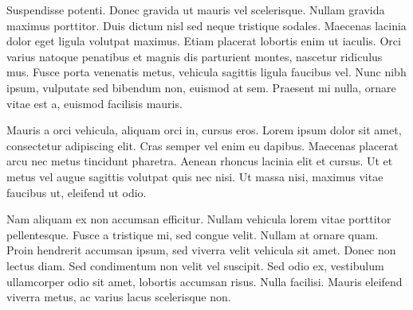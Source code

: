 \documentclass[10pt]{article}
\begin{document}
Suspendisse potenti. Donec gravida ut mauris vel scelerisque. Nullam
gravida maximus porttitor. Duis dictum nisl sed neque tristique sodales.
Maecenas lacinia dolor eget ligula volutpat maximus. Etiam placerat
lobortis enim ut iaculis. Orci varius natoque penatibus et magnis dis
parturient montes, nascetur ridiculus mus. Fusce porta venenatis metus,
vehicula sagittis ligula faucibus vel. Nunc nibh ipsum, vulputate sed
bibendum non, euismod at sem. Praesent mi nulla, ornare vitae est a,
euismod facilisis mauris.

Mauris a orci vehicula, aliquam orci in, cursus eros. Lorem ipsum dolor
sit amet, consectetur adipiscing elit. Cras semper vel enim eu dapibus.
Maecenas placerat arcu nec metus tincidunt pharetra. Aenean rhoncus
lacinia elit et cursus. Ut et metus vel augue sagittis volutpat quis nec
nisi. Ut massa nisi, maximus vitae faucibus ut, eleifend ut odio.

Nam aliquam ex non accumsan efficitur. Nullam vehicula lorem vitae
porttitor pellentesque. Fusce a tristique mi, sed congue velit. Nullam
at ornare quam. Proin hendrerit accumsan ipsum, sed viverra velit
vehicula sit amet. Donec non lectus diam. Sed condimentum non velit vel
suscipit. Sed odio ex, vestibulum ullamcorper odio sit amet, lobortis
accumsan risus. Nulla facilisi. Mauris eleifend viverra metus, ac varius
lacus scelerisque non.
\end{document}
